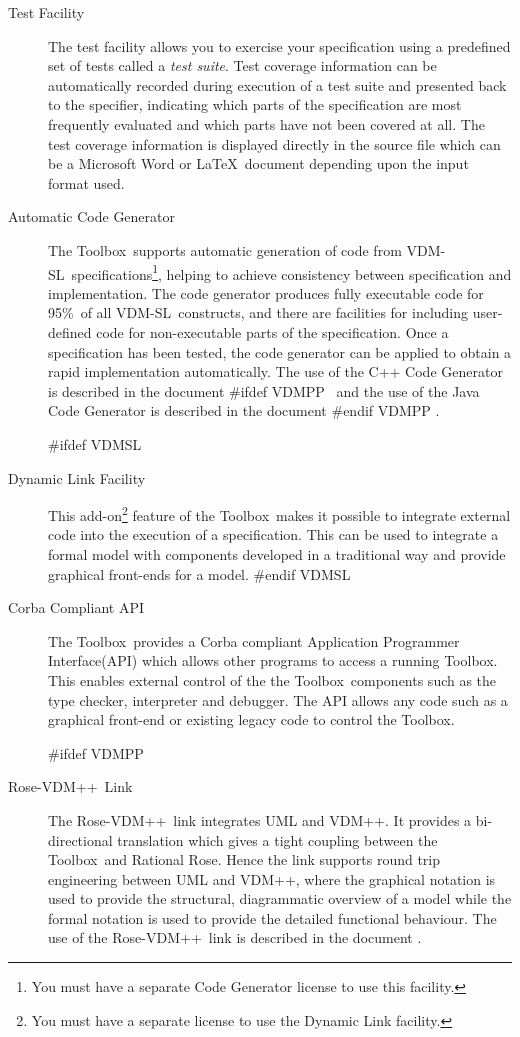 \documentclass[\pformat,12pt]{article}
\def\vdmpp{{\small VDM}++}
\newcommand{\vdmslpp}{VDM-SL}
\newcommand{\Toolbox}{Toolbox}
\newcommand{\vdmslpp}{VDM++}
\newcommand{\Toolbox}{Toolbox}
\begin{document}
\begin{description}
\item[Test Facility] The test facility allows you to exercise your
  specification using a predefined set of tests called a {\em test
    suite\/}. Test coverage information can be automatically recorded
  during execution of a test suite and presented back to the
  specifier, indicating which parts of the specification are most
  frequently evaluated and which parts have not been covered at all.
  The test coverage information is displayed directly in the source
  file which can be a Microsoft Word or \LaTeX\ document depending
  upon the input format used.

\item[Automatic Code Generator] The \Toolbox\ supports automatic
  generation of  code
  from \vdmslpp\ specifications\footnote{You must have a separate Code
    Generator license to use this facility.}, helping to achieve
  consistency between specification and implementation. The code
  generator produces fully executable code for 95\%\ of all \vdmslpp\
  constructs, and there are facilities for including user-defined code
  for non-executable parts of the specification.  Once a specification
  has been tested, the code generator can be applied to obtain a rapid
  implementation automatically. The use of the C++ Code Generator is
  described in the document
#ifdef VDMPP
\ and the use of the Java Code Generator is described in the document
\cite{CGJavaManPP-CSK}%
#endif VDMPP
.

#ifdef VDMSL
\item[Dynamic Link Facility] This add-on\footnote{You must have a
    separate license to use the Dynamic Link facility.} feature of the
  \Toolbox\ makes it possible to integrate external code into the
  execution of a specification.  This can be used to integrate a
  formal model with components developed in a traditional way and
  provide graphical front-ends for a model.  
#endif VDMSL

\item[Corba Compliant API] The \Toolbox\ provides a Corba compliant
  Application Programmer Interface(API) which allows other programs
  to access a running \Toolbox. This enables external control of the
  the \Toolbox\ components such as the type checker, interpreter and
  debugger. The API allows any code such as a graphical front-end or
  existing legacy code to control the \Toolbox.

#ifdef VDMPP
\item[Rose-\vdmpp\ Link] The Rose-\vdmpp\ link integrates UML and
  \vdmpp.  It provides a bi-directional translation which gives a
  tight coupling between the \Toolbox\ and Rational Rose. Hence the
  link supports round trip engineering between UML and \vdmpp, where
  the graphical notation is used to provide the structural,
  diagrammatic overview of a model while the formal notation is used
  to provide the detailed functional behaviour. The use of
  the Rose-\vdmpp\ link is described in the document \cite{UMLMan-CSK}.


\end{description}
\end{document}

